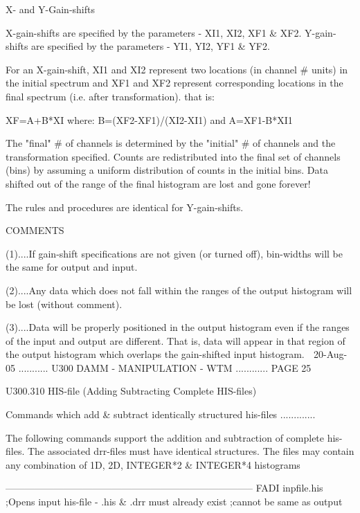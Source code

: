                               X- and Y-Gain-shifts
 
   X-gain-shifts are specified by the parameters - XI1, XI2, XF1 & XF2.
   Y-gain-shifts are specified by the parameters - YI1, YI2, YF1 & YF2.
 
   For an X-gain-shift, XI1 and XI2 represent  two  locations  (in  channel  #
   units)  in  the  initial  spectrum  and XF1 and XF2 represent corresponding
   locations in the final spectrum (i.e. after transformation). that is:
 
            XF=A+B*XI
   where:   B=(XF2-XF1)/(XI2-XI1)
   and      A=XF1-B*XI1
 
   The "final" # of channels is determined by the "initial" # of channels  and
   the  transformation  specified. Counts are redistributed into the final set
   of channels (bins) by assuming a uniform  distribution  of  counts  in  the
   initial  bins.  Data  shifted  out  of the range of the final histogram are
   lost and gone forever!
 
   The rules and procedures are identical for Y-gain-shifts.
 
                                    COMMENTS
 
   (1)....If   gain-shift  specifications  are  not  given  (or  turned  off),
          bin-widths will be the same for output and input.
 
   (2)....Any data which does  not  fall  within  the  ranges  of  the  output
          histogram will be lost (without comment).
 
   (3)....Data  will  be  properly  positioned in the output histogram even if
          the ranges of the input and output  are  different.  That  is,  data
          will  appear  in  that region of the output histogram which overlaps
          the gain-shifted input histogram.
    
   20-Aug-05 ........... U300  DAMM - MANIPULATION - WTM ............ PAGE  25
 
 
   U300.310  HIS-file (Adding Subtracting Complete HIS-files)
 
   Commands which add & subtract identically structured  his-files .............
 
   The following commands support the addition  and  subtraction  of  complete
   his-files.  The  associated  drr-files  must have identical structures. The
   files may  contain  any  combination  of  1D,  2D,  INTEGER*2  &  INTEGER*4
   histograms
 
   -----------------------------------------------------------------------------
   FADI   inpfile.his  ;Opens input  his-file - .his & .drr must already exist
                       ;cannot be same as output
 
